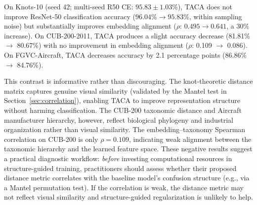 \documentclass[preprint,review,12pt]{elsarticle}
\begin{document}
On Knots-10 (seed 42; multi-seed R50 CE: $95.83 \pm 1.03\%$), TACA does not improve ResNet-50 classification accuracy ($96.04\% \to 95.83\%$, within sampling noise) but substantially improves embedding alignment ($\rho$: $0.495 \to 0.641$, a 30\% increase). On CUB-200-2011, TACA produces a slight accuracy decrease (81.81\% $\to$ 80.67\%) with no improvement in embedding alignment ($\rho$: 0.109 $\to$ 0.086). On FGVC-Aircraft, TACA decreases accuracy by 2.1 percentage points (86.86\% $\to$ 84.76\%).

This contrast is informative rather than discouraging. The knot-theoretic distance matrix captures genuine visual similarity (validated by the Mantel test in Section~\ref{sec:correlation}), enabling TACA to improve representation structure without harming classification. The CUB-200 taxonomic distance and Aircraft manufacturer hierarchy, however, reflect biological phylogeny and industrial organization rather than visual similarity. The embedding--taxonomy Spearman correlation on CUB-200 is only $\rho = 0.109$, indicating weak alignment between the taxonomic hierarchy and the learned feature space. These negative results suggest a practical diagnostic workflow: \emph{before} investing computational resources in structure-guided training, practitioners should assess whether their proposed distance metric correlates with the baseline model's confusion structure (e.g., via a Mantel permutation test). If the correlation is weak, the distance metric may not reflect visual similarity and structure-guided regularization is unlikely to help.
\end{document}

